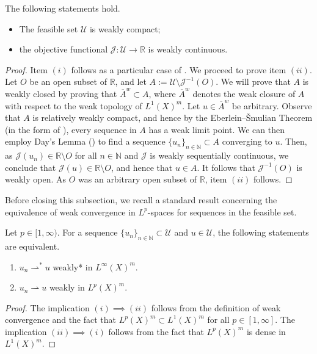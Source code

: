 \documentclass[hidelinks,onefignum,onetabnum]{siamart220329}
\begin{document}
\begin{lemma}
	The following statements hold.
	\begin{itemize}
		\item[(i)] The feasible set $\mathcal U$ is weakly compact;
		
		\item[(ii)] the objective functional $\mathcal J:\mathcal U\to\mathbb R$ is weakly continuous.
	\end{itemize}
\end{lemma}
\begin{proof}
	Item $(i)$ follows as a particular case of \cite[Theorem 6.4.23]{Anhand}. We proceed to prove item $(ii)$. Let $O$ be an open subset of $\mathbb R$, and let $A:=\mathcal U\setminus\mathcal J^{-1}(O)$. We will prove that $A$ is weakly closed by proving that $\overline{A}^{w} \subset A$, where $\overline{A}^{w}$ denotes the weak closure of $A$ with respect to the weak topology of $L^1(X)^m$. Let $u\in \overline{A}^w$ be arbitrary. Observe that $A$ is relatively weakly compact, and hence by the  Eberlein--\v{S}mulian Theorem (in the form of \cite[Theorem 2.8.6]{Megginson}), every sequence in $A$ has a weak limit point.  We can then employ Day's Lemma (\cite[Lemma 2.8.5]{Megginson}) to find a sequence $\{u_n\}_{n\in\mathbb N}\subset A$ converging to $u$. Then, as $\mathcal J(u_n)\in \mathbb R\setminus O$ for all $n\in\mathbb N$ and $\mathcal J$ is  weakly sequentially continuous, we conclude that $\mathcal J(u)\in\mathbb R\setminus O$, and hence that $u\in A$. It follows that $\mathcal J^{-1}(O)$ is weakly open. As $O$ was an arbitrary open subset of $\mathbb R$, item $(ii)$ follows.
\end{proof}

 Before closing this subsection, we recall a standard result concerning the equivalence of  weak convergence in $L^p$-spaces for sequences in the feasible set.

\begin{lemma}
	Let $p\in[1,\infty)$. For a sequence $\{u_n\}_{n\in\mathbb N}\subset\mathcal U$ and $u\in\mathcal U$, the following statements are equivalent.
	\begin{enumerate}
		\item $u_n\rightharpoonup^* u$ weakly* in ${L^\infty(X)^m}$.
		
		\item $u_n\rightharpoonup u$ weakly in $L^{p}(X)^m$. 
	\end{enumerate}
\end{lemma}
\begin{proof}
	The implication $(i)\implies(ii)$ follows from the definition of weak convergence and the fact that $L^p(X)^m\subset L^1(X)^m$ for all $p\in[1,\infty]$. The implication $(ii)\implies(i)$ follows from the fact that $L^p(X)^m$ is dense in $L^1(X)^m$.
\end{proof}
\fi
\end{document}
